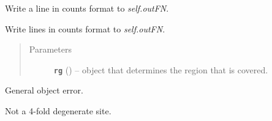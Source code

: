 \documentclass[letterpaper,10pt,english]{sphinxmanual}
\begin{document}
\begin{fulllineitems}
\begin{fulllineitems}
\end{fulllineitems}


\begin{fulllineitems}
\label{cf:libPoMo.cf.CFWriter.write_Ln}
Write a line in counts format to \emph{self.outFN}.

\end{fulllineitems}


\begin{fulllineitems}
\label{cf:libPoMo.cf.CFWriter.write_Rn}
Write lines in counts format to \emph{self.outFN}.
\begin{quote}\begin{description}
\item[{Parameters}] \leavevmode
\textbf{\texttt{rg}} ({\hyperref[seqbase:libPoMo.seqbase.Region]{}}) -- {\hyperref[seqbase:libPoMo.seqbase.Region]{}}
object that determines the region that is
covered.

\end{description}\end{quote}

\end{fulllineitems}


\end{fulllineitems}


\begin{fulllineitems}
\label{cf:libPoMo.cf.CountsFormatWriterError}
General  object error.

\end{fulllineitems}


\begin{fulllineitems}
\label{cf:libPoMo.cf.NoSynBase}
Not a 4-fold degenerate site.

\end{fulllineitems}
\end{document}
